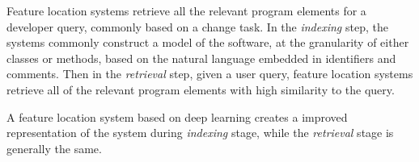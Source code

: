 
%      
%

Feature location systems retrieve all the relevant program elements
for a developer query, commonly based on a change task. In the {\em
  indexing} step, the systems commonly construct a model of the
software, at the granularity of either classes or methods, based on
the natural language embedded in identifiers and comments. Then in the
{\em retrieval} step, given a user query, feature location systems
retrieve all of the relevant program elements with high similarity to
the query.

A feature location system based on deep learning creates a improved
representation of the system during {\em indexing} stage, while
the {\em retrieval} stage is generally the same.




%


%




